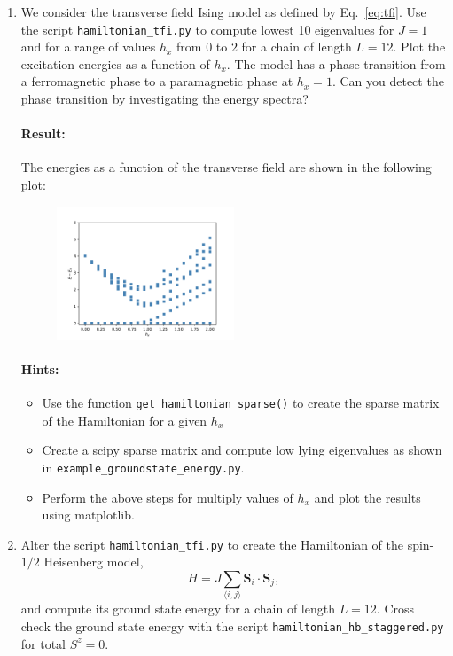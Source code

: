 \documentclass[]{article}
\theoremstyle{definition}
\begin{document}
\begin{enumerate}[label=(\alph*)]
\item We consider the transverse field Ising model as defined by
  Eq.~\ref{eq:tfi}. Use the script \texttt{hamiltonian\_tfi.py} to
  compute lowest 10 eigenvalues for $J=1$ and for a range of values
  $h_x$ from $0$ to $2$ for a chain of length $L=12$. Plot the
  excitation energies as a function of $h_x$. The model has a phase
  transition from a ferromagnetic phase to a paramagnetic phase at
  $h_x=1$.  Can you detect the phase transition by investigating the
  energy spectra?
  \paragraph{Result:}
  The energies as a function of the transverse field are shown in the
  following plot:
  \begin{figure}[H]
    \centering
    \includegraphics[width=0.5\textwidth]{spectra_tfi_12.pdf}
  \end{figure}

  \paragraph{Hints:}
  \begin{itemize}
  \item Use the function \texttt{get\_hamiltonian\_sparse()} to create
    the sparse matrix of the Hamiltonian for a given $h_x$
  \item Create a scipy sparse matrix and compute low lying eigenvalues
    as shown in \texttt{example\_groundstate\_energy.py}.
  \item Perform the above steps for multiply values of $h_x$ and plot
    the results using matplotlib.
  \end{itemize}

  
\item Alter the script \texttt{hamiltonian\_tfi.py} to create the
  Hamiltonian of the spin-$1/2$ Heisenberg model,
  \begin{equation}
    \label{eq:hb}
    H = J\sum\limits_{\langle i , j \rangle} \mathbf{S}_i\cdot\mathbf{S}_j,
  \end{equation}
  and compute its ground state energy for a chain of length $L=12$.
  Cross check the ground state energy with the script
  \texttt{hamiltonian\_hb\_staggered.py} for total $S^z=0$.


\end{enumerate}
\end{document}
